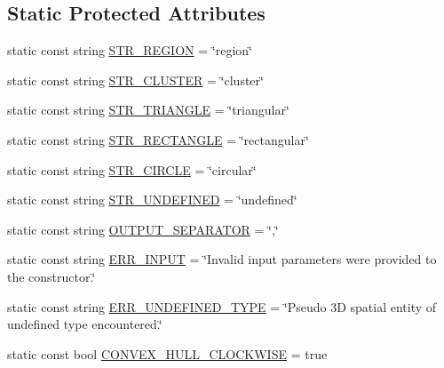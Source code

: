 \subsection*{Static Protected Attributes}
\begin{DoxyCompactItemize}
\item 
static const string \hyperlink{classmultiscale_1_1analysis_1_1SpatialEntityPseudo3D_a30d78540776d80a96e8cfe16645cf50a}{S\-T\-R\-\_\-\-R\-E\-G\-I\-O\-N} = \char`\"{}region\char`\"{}
\item 
static const string \hyperlink{classmultiscale_1_1analysis_1_1SpatialEntityPseudo3D_aa7104d49e4b42c312a942c4795353f10}{S\-T\-R\-\_\-\-C\-L\-U\-S\-T\-E\-R} = \char`\"{}cluster\char`\"{}
\item 
static const string \hyperlink{classmultiscale_1_1analysis_1_1SpatialEntityPseudo3D_a8ad67f0073da808ad1badedf2e613ed3}{S\-T\-R\-\_\-\-T\-R\-I\-A\-N\-G\-L\-E} = \char`\"{}triangular\char`\"{}
\item 
static const string \hyperlink{classmultiscale_1_1analysis_1_1SpatialEntityPseudo3D_a9b80a7c37a8c82fed02a1e23b1173843}{S\-T\-R\-\_\-\-R\-E\-C\-T\-A\-N\-G\-L\-E} = \char`\"{}rectangular\char`\"{}
\item 
static const string \hyperlink{classmultiscale_1_1analysis_1_1SpatialEntityPseudo3D_a561e862c97a4717eb5b4977c55d05d90}{S\-T\-R\-\_\-\-C\-I\-R\-C\-L\-E} = \char`\"{}circular\char`\"{}
\item 
static const string \hyperlink{classmultiscale_1_1analysis_1_1SpatialEntityPseudo3D_ae4e33ad9bcad430b929b601c5571a6fd}{S\-T\-R\-\_\-\-U\-N\-D\-E\-F\-I\-N\-E\-D} = \char`\"{}undefined\char`\"{}
\item 
static const string \hyperlink{classmultiscale_1_1analysis_1_1SpatialEntityPseudo3D_a4ee08be9b4119b90f0a996704d179635}{O\-U\-T\-P\-U\-T\-\_\-\-S\-E\-P\-A\-R\-A\-T\-O\-R} = \char`\"{},\char`\"{}
\item 
static const string \hyperlink{classmultiscale_1_1analysis_1_1SpatialEntityPseudo3D_a5882e2e18343ccee821f1bd6b9c23724}{E\-R\-R\-\_\-\-I\-N\-P\-U\-T} = \char`\"{}Invalid input parameters were provided to the constructor.\char`\"{}
\item 
static const string \hyperlink{classmultiscale_1_1analysis_1_1SpatialEntityPseudo3D_ad16aacdb05ba1922124c6b6c76077d32}{E\-R\-R\-\_\-\-U\-N\-D\-E\-F\-I\-N\-E\-D\-\_\-\-T\-Y\-P\-E} = \char`\"{}Pseudo 3\-D spatial entity of undefined type encountered.\char`\"{}
\item 
static const bool \hyperlink{classmultiscale_1_1analysis_1_1SpatialEntityPseudo3D_ad92f43d2b14c77def3f7a70b54810dd2}{C\-O\-N\-V\-E\-X\-\_\-\-H\-U\-L\-L\-\_\-\-C\-L\-O\-C\-K\-W\-I\-S\-E} = true
\end{DoxyCompactItemize}
